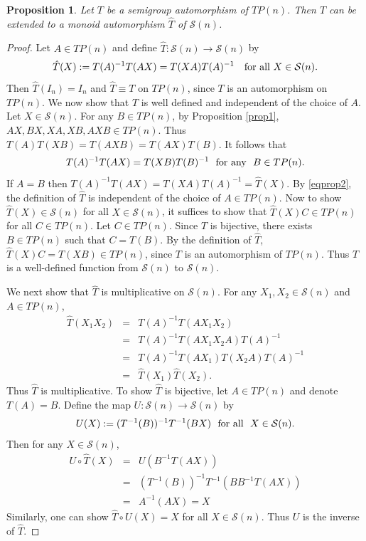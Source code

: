 \documentclass[11pt,reqno]{amsart}
\theoremstyle{plain}
\newtheorem{prop}[theorem]{Proposition}
\theoremstyle{definition}
\numberwithin{equation}{section}
\def\cS{\mathcal S}
\begin{document}
\begin{prop}\label{prop2}
Let $T$ be a semigroup automorphism of $TP(n)$.  Then $T$ can be extended to a monoid automorphism $\hat{T}$ of $\cS(n)$.%
\end{prop}
\begin{proof}
 Let $A\in TP(n)$ and define  $\hat T: \cS(n) \rightarrow \cS(n)$ by
\[\hat T(X): = T(A)^{-1}T(AX) = T(XA) T(A)^{-1} \quad \hbox{for all } X \in \cS(n).\]
Then $\hat T (I_n)=I_n$ and $\hat{T} \equiv T$ on $TP(n)$, since $T$ is an automorphism on $TP(n)$.
We now show that $\hat{T}$ is well defined and independent of the choice of $A$. Let  $X \in \cS(n)$. For any $B \in TP(n)$, by Proposition \ref{prop1}, $AX, BX, XA, XB, AXB \in TP(n)$. Thus $T(A)T(XB) = T(AXB) = T(AX)T(B)$.
It follows that
 \begin{equation}\label{eqprop2}
T(A)^{-1}T(AX) = T(XB)T(B)^{-1}~~ \hbox{for any}~~ B\in TP(n).
\end{equation}
If $A = B$ then $T(A)^{-1}T(AX) = T(XA)T(A)^{-1}=\hat T(X)$. By \eqref{eqprop2}, the definition of $\hat T$ is independent of the choice of $A \in TP(n)$.  Now to show $\hat T(X) \in \cS(n)$ for all $X\in \cS(n)$, it suffices to show that $\hat T(X)C \in TP(n)$ for all $C\in TP(n)$.  Let $C\in TP(n)$. Since $T$ is bijective, there exists $B \in TP(n)$ such that $C=T(B)$. By the definition of $\hat T$, $\hat T(X)C=T(XB)\in TP(n)$, since $T$ is an automorphism of $TP(n)$.  Thus $\hat T$ is a well-defined function from $\cS(n)$ to $\cS(n)$.

We next show that $\hat T$ is multiplicative on $\cS(n)$. For any $X_1, X_2 \in \cS(n)$ and $A\in TP(n)$,
\begin{eqnarray*}
\hat T(X_1X_2) &=& T(A)^{-1}T(AX_1X_2) \\&=& T(A)^{-1}T(AX_1X_2A)T(A)^{-1}\\
&=& T(A)^{-1}T(AX_1) T(X_2A)T(A)^{-1}\\& =& \hat T(X_1)\hat T(X_2).
\end{eqnarray*}
Thus $\hat T$ is multiplicative.  To show $\hat T$ is bijective, let $A\in TP(n)$ and denote $ T(A)=B$.  Define the map $U: \cS(n) \to \cS(n)$ by
	\[U(X) := (T^{-1}(B))^{-1} T^{-1}(BX)~~ \hbox{for all}~~ X \in \cS(n).\]
Then for any $X \in \cS(n)$, 
\begin{eqnarray*}
U\circ \hat T(X) &=& U(B^{-1}T(AX))\\
&=& (T^{-1}(B))^{-1} T^{-1}(B B^{-1}T(AX)) \\
&=& A^{-1} (AX)=X
\end{eqnarray*}
Similarly, one can show  $\hat T \circ U(X) = X$ for all $X\in \cS(n)$. Thus $U$ is the inverse of $\hat T$. 
\end{proof}
\end{document}
